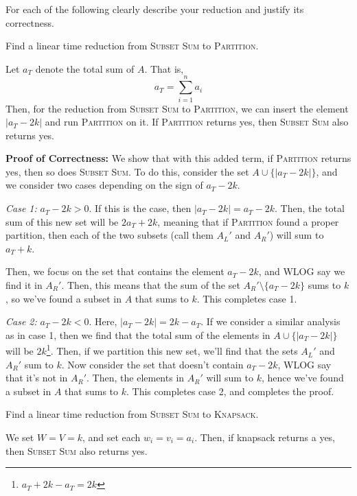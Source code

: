 \documentclass[11pt]{article}
\begin{document}
\noindent For each of the following clearly describe your reduction and justify its correctness.
\begin{subparts}
\subpart Find a linear time reduction from \textsc{Subset Sum} to \textsc{Partition}.

\begin{solution}
	Let \( a_T \) denote the total sum of \( A \). That is, 
	\[
		a_T = \sum_{i = 1}^{n} a_i
	\] 
	Then, for the reduction from \textsc{Subset Sum} to \textsc{Partition}, we can insert the element 
	\( |a_T - 2k| \) and run \textsc{Partition} on it. If \textsc{Partition} returns yes, then 
	\textsc{Subset Sum} also returns yes. 

	\textbf{Proof of Correctness:} We show that with this added term, if \textsc{Partition} returns yes, then so 
	does \textsc{Subset Sum}. To do this, consider the set \( A \cup \{|a_T - 2k|\} \), and we consider 
	two cases depending on the sign of \( a_T - 2k \). 

	\textit{Case 1:} \( a_T - 2k > 0 \). If this is the case, then \( |a_T - 2k| = a_T - 2k \). Then, 
	the total sum of this new set will be \( 2a_T + 2k \), meaning that if \textsc{Partition} found a proper
	partition, then each of the two subsets (call them \( A_L' \) and \( A_R' \)) will sum to \( a_T + k \). 
	
	Then, we focus on the set that contains the element  \( a_T - 2k \), and WLOG say we find it in \( A_R' \).
	Then, this means that the sum of the set \( A_R' \setminus \{a_T - 2k\}  \) sums to \( k \), so we've found 
	a subset in \( A \) that sums to \( k \). This completes case 1. 


	\textit{Case 2:} \( a_T - 2k < 0 \). Here, \( |a_T - 2k| = 2k - a_T \). If we consider a similar analysis 
	as in case 1, then we find that the total sum of the elements in \( A \cup \{|a_T - 2k|\}  \) 
	will be \( 2k \)\footnote{\( a_T + 2k - a_T = 2k \) }. Then, if we 
	partition this new set, we'll find that the sets \( A_L' \) and \( A_R' \) sum to \( k \). Now consider 
	the set that doesn't contain \( a_T - 2k \), WLOG say that it's not in \( A_R' \). Then, the elements 
	in \( A_R' \) will sum to \( k \), hence we've found a subset in \( A \) that sums to \( k \). This 
	completes case 2, and completes the proof.
\end{solution}
\subpart Find a linear time reduction from \textsc{Subset Sum} to \textsc{Knapsack}.

\begin{solution}
	We set \( W = V = k \), and set each \( w_i = v_i = a_i \). Then, if knapsack returns a yes, then 
	\textsc{Subset Sum} also returns yes. 


\end{solution}
\end{subparts}
\end{document}
